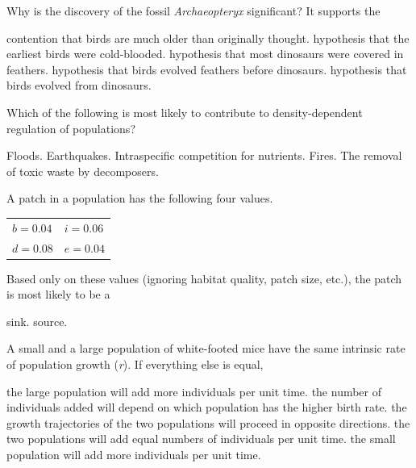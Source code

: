 
\question
Why is the discovery of the fossil \textit{Archaeopteryx} significant? It supports the  

\begin{choices}
\choice contention that birds are much older than originally thought. 
\choice hypothesis that the earliest birds were cold-blooded. 
\choice hypothesis that most dinosaurs were covered in feathers. 
\choice hypothesis that birds evolved feathers before dinosaurs. 
\correctchoice hypothesis that birds evolved from dinosaurs. 
\end{choices}

\question
Which of the following is most likely to contribute to density-dependent regulation of populations?

\begin{choices}
\choice Floods.
\choice Earthquakes.
\correctchoice Intraspecific competition for nutrients.
\choice Fires.
\choice The removal of toxic waste by decomposers.
\end{choices}

\question
A patch in a population has the following four values. 

\qquad\begin{tabular}{@{}ll@{}}
	$b = 0.04$ & $i = 0.06$\\
	$d = 0.08$ & $e = 0.04$\\
\end{tabular}

Based only on these values (ignoring habitat quality, patch size, etc.), the patch is most likely to be a 

\begin{choices}
\correctchoice sink.
\choice  source. 
\end{choices}

\question
A small and a large population of white-footed mice have the same intrinsic rate of population growth (\textit{r}).  If everything else is equal, 

\begin{choices}
\correctchoice the large population will add more individuals per unit time.  
\choice the number of individuals added will depend on which population has the higher birth rate. 
\choice the growth trajectories of the two populations will proceed in opposite directions. 
\choice the two populations will add equal numbers of individuals per unit time.
\choice the small population will add more individuals per unit time. 
\end{choices}

